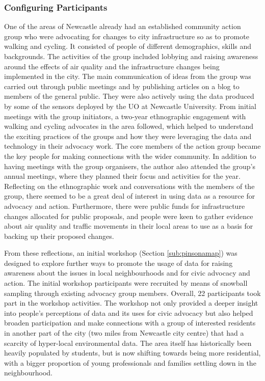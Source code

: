 \subsubsection{Configuring Participants}
\label{sub:config_par}
One of the areas of Newcastle already had an established community action group who were advocating for changes to city infrastructure so as to promote walking and cycling. It consisted of people of different demographics, skills and backgrounds. The activities of the group included lobbying and raising awareness around the effects of air quality and the infrastructure changes being implemented in the city. The main communication of ideas from the group was carried out through public meetings and by publishing articles on a blog to members of the general public. They were also actively using the data produced by some of the sensors deployed by the UO at Newcastle University. From initial meetings with the group initiators, a two-year ethnographic engagement with walking and cycling advocates in the area followed, which helped to understand the exciting practices of the groups and how they were leveraging the data and technology in their advocacy work. The core members of the action group became the key people for making connections with the wider community. In addition to having meetings with the group organisers, the author also attended the group's annual meetings, where they planned their focus and activities for the year. Reflecting on the ethnographic work and conversations with the members of the group, there seemed to be a great deal of interest in using data as a resource for advocacy and action. Furthermore, there were public funds for infrastructure changes allocated for public proposals, and people were keen to gather evidence about air quality and traffic movements in their local areas to use as a basis for backing up their proposed changes.

From these reflections, an initial workshop (Section \ref{sub:pinsonamap}) was designed to explore further ways to promote the usage of data for raising awareness about the issues in local neighbourhoods and for civic advocacy and action. The initial workshop participants were recruited by means of snowball sampling through existing advocacy group members. Overall, 22 participants took part in the workshop activities. The workshop not only provided a deeper insight into people's perceptions of data and its uses for civic advocacy but also helped broaden participation and make connections with a group of interested residents in another part of the city (two miles from Newcastle city centre) that had a scarcity of hyper-local environmental data. The area itself has historically been heavily populated by students, but is now shifting towards being more residential, with a bigger proportion of young professionals and families settling down in the neighbourhood.


